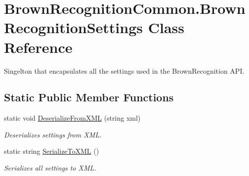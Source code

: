 \hypertarget{class_brown_recognition_common_1_1_brown_recognition_settings}{
\section{\-Brown\-Recognition\-Common.\-Brown\-Recognition\-Settings \-Class \-Reference}
\label{class_brown_recognition_common_1_1_brown_recognition_settings}
}


\-Singelton that encapsulates all the settings used in the \-Brown\-Recognition \-A\-P\-I.  


\subsection*{\-Static \-Public \-Member \-Functions}
\begin{DoxyCompactItemize}
\item 
static void \hyperlink{class_brown_recognition_common_1_1_brown_recognition_settings_a8c983624c8e0ac5ae928038fe46173e6}{\-Deserialize\-From\-X\-M\-L} (string xml)
\begin{DoxyCompactList}\small\item\em \-Deserializes settings from \-X\-M\-L. \end{DoxyCompactList}\item 
static string \hyperlink{class_brown_recognition_common_1_1_brown_recognition_settings_a2095bf7d5e101813fb61f5386ce9a716}{\-Serialize\-To\-X\-M\-L} ()
\begin{DoxyCompactList}\small\item\em \-Serializes all settings to \-X\-M\-L. \end{DoxyCompactList}\end{DoxyCompactItemize}
